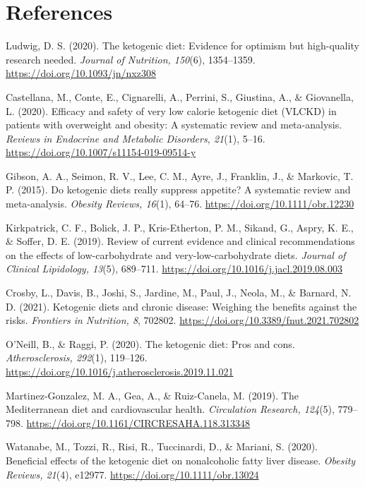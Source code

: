\documentclass[12pt]{article}
\begin{document}
\section*{References}\vspace{-1em}
\begin{hangparas}{.1in}{1}
Ludwig, D. S. (2020). The ketogenic diet: Evidence for optimism but high-quality research needed. \textit{Journal of Nutrition, 150}(6), 1354--1359. \url{https://doi.org/10.1093/jn/nxz308}

Castellana, M., Conte, E., Cignarelli, A., Perrini, S., Giustina, A., \& Giovanella, L. (2020). Efficacy and safety of very low calorie ketogenic diet (VLCKD) in patients with overweight and obesity: A systematic review and meta-analysis. \textit{Reviews in Endocrine and Metabolic Disorders, 21}(1), 5--16. \url{https://doi.org/10.1007/s11154-019-09514-y}

Gibson, A. A., Seimon, R. V., Lee, C. M., Ayre, J., Franklin, J., \& Markovic, T. P. (2015). Do ketogenic diets really suppress appetite? A systematic review and meta‐analysis. \textit{Obesity Reviews, 16}(1), 64--76. \url{https://doi.org/10.1111/obr.12230}

Kirkpatrick, C. F., Bolick, J. P., Kris-Etherton, P. M., Sikand, G., Aspry, K. E., \& Soffer, D. E. (2019). Review of current evidence and clinical recommendations on the effects of low-carbohydrate and very-low-carbohydrate diets. \textit{Journal of Clinical Lipidology, 13}(5), 689--711. \url{https://doi.org/10.1016/j.jacl.2019.08.003}

Crosby, L., Davis, B., Joshi, S., Jardine, M., Paul, J., Neola, M., \& Barnard, N. D. (2021). Ketogenic diets and chronic disease: Weighing the benefits against the risks. \textit{Frontiers in Nutrition, 8}, 702802. \url{https://doi.org/10.3389/fnut.2021.702802}

O'Neill, B., \& Raggi, P. (2020). The ketogenic diet: Pros and cons. \textit{Atherosclerosis, 292}(1), 119--126. \url{https://doi.org/10.1016/j.atherosclerosis.2019.11.021}

Martinez-Gonzalez, M. A., Gea, A., \& Ruiz-Canela, M. (2019). The Mediterranean diet and cardiovascular health. \textit{Circulation Research, 124}(5), 779--798. \url{https://doi.org/10.1161/CIRCRESAHA.118.313348}

Watanabe, M., Tozzi, R., Risi, R., Tuccinardi, D., \& Mariani, S. (2020). Beneficial effects of the ketogenic diet on nonalcoholic fatty liver disease. \textit{Obesity Reviews, 21}(4), e12977. \url{https://doi.org/10.1111/obr.13024}
\end{hangparas}
\end{document}
